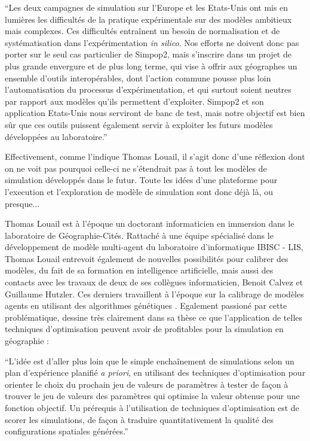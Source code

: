 \enquote{Les deux campagnes de simulation sur l’Europe et les Etats-Unis ont mis en lumières les difficultés de la pratique expérimentale sur des modèles ambitieux mais complexes. Ces difficultés entraînent un besoin de normalisation et de systématisation dans l’expérimentation \textit{in silico}. Nos efforts ne doivent donc pas porter sur le seul cas particulier de Simpop2, mais s’inscrire dans un projet de plus grande envergure et de plus long terme, qui vise à offrir aux géographes un ensemble d’outils interopérables, dont l’action commune pousse plus loin l’automatisation du processus d’expérimentation, et qui surtout soient neutres par rapport aux modèles qu’ils permettent d’exploiter. Simpop2 et son application Etats-Unis nous serviront de banc de test, mais notre objectif est bien sûr que ces outils puissent également servir à exploiter les futurs modèles développées au laboratoire.} \autocite[132]{Louail2010}

Effectivement, comme l'indique Thomas Louail, il s'agit donc d'une réflexion dont on ne voit pas pourquoi celle-ci ne s'étendrait pas à tout les modèles de simulation développés dans le futur. Toute les idées d'une plateforme pour l'execution et l'exploration de modèle de simulation sont donc déjà là, ou presque...

Thomas Louail est à l'époque un doctorant informaticien en immersion dans le laboratoire de Géographie-Cités. Rattaché à une équipe spécialisé dans le développement de modèle multi-agent du laboratoire d'informatique IBISC - LIS, Thomas Louail entrevoit également de nouvelles possibilités pour calibrer des modèles, du fait de sa formation en intelligence artificielle, mais aussi des contacts avec les travaux de deux de ses collègues informaticien, Benoit Calvez et Guillaume Hutzler. Ces derniers travaillent à l'époque sur la calibrage de modèles agents en utilisant des algorithmes génétiques \autocites{Calvez2005,Calvez2007}. Egalement passioné par cette problématique, \textcite[139-141]{Louail2010} dessine très clairement dans sa thèse ce que l'application de telles techniques d'optimisation peuvent avoir de profitables pour la simulation en géographie :

\enquote{L’idée est d’aller plus loin que le simple enchaînement de simulations selon un plan d’expérience planifié \textit{a priori}, en utilisant des techniques d’optimisation pour orienter le choix
du prochain jeu de valeurs de paramètres à tester de façon à trouver le jeu de valeurs des paramètres qui optimise la valeur obtenue pour une fonction objectif. Un prérequis à l’utilisation de techniques d’optimisation est de scorer les simulations, de façon à traduire quantitativement la qualité des configurations spatiales générées.}

